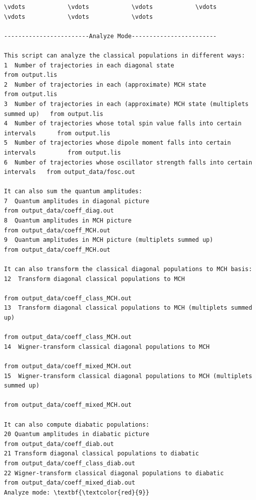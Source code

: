 \documentclass[a4paper,11pt,DIV=15,openany]{scrbook}
\begin{document}
\begin{oframed}
\footnotesize\begin{Verbatim}[commandchars=\\\{\}]
\vdots            \vdots            \vdots            \vdots            \vdots            \vdots            \vdots            

------------------------Analyze Mode------------------------

This script can analyze the classical populations in different ways:
1  Number of trajectories in each diagonal state                                   from output.lis
2  Number of trajectories in each (approximate) MCH state                          from output.lis
3  Number of trajectories in each (approximate) MCH state (multiplets summed up)   from output.lis
4  Number of trajectories whose total spin value falls into certain intervals      from output.lis
5  Number of trajectories whose dipole moment falls into certain intervals         from output.lis
6  Number of trajectories whose oscillator strength falls into certain intervals   from output_data/fosc.out

It can also sum the quantum amplitudes:
7  Quantum amplitudes in diagonal picture                                    from output_data/coeff_diag.out
8  Quantum amplitudes in MCH picture                                         from output_data/coeff_MCH.out
9  Quantum amplitudes in MCH picture (multiplets summed up)                  from output_data/coeff_MCH.out

It can also transform the classical diagonal populations to MCH basis:
12  Transform diagonal classical populations to MCH
                                                                        from output_data/coeff_class_MCH.out
13  Transform diagonal classical populations to MCH (multiplets summed up)
                                                                        from output_data/coeff_class_MCH.out 
14  Wigner-transform classical diagonal populations to MCH
                                                                        from output_data/coeff_mixed_MCH.out
15  Wigner-transform classical diagonal populations to MCH (multiplets summed up)
                                                                        from output_data/coeff_mixed_MCH.out

It can also compute diabatic populations:
20 Quantum amplitudes in diabatic picture                              from output_data/coeff_diab.out
21 Transform diagonal classical populations to diabatic                from output_data/coeff_class_diab.out
22 Wigner-transform classical diagonal populations to diabatic         from output_data/coeff_mixed_diab.out
Analyze mode: \textbf{\textcolor{red}{9}}


\end{Verbatim}
\end{oframed}
\end{document}
